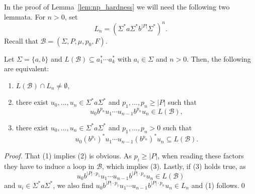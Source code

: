 \begin{toappendix}

In the proof of Lemma~\ref{lem:np_hardness}
we will need the following two lemmata.
For $n > 0$, set
\[
 L_n = (\Sigma^* a \Sigma^* b^{|P|} \Sigma^*)^n.
\]
Recall that $\mathcal B = (\Sigma, P, \mu, p_0, F)$.

\begin{lemma}
\label{lem:number_of_b_blocks}
 Let $\Sigma = \{a,b\}$ and $L(\mathcal B) \subseteq a_1^* \cdots a_k^*$
 with $a_i \in \Sigma $ and $n > 0$.
 Then, the following are equivalent:
 \begin{enumerate} 
 \item $L(\mathcal B) \cap L_n \ne \emptyset$,
 
 \item there exist $u_0, \ldots, u_n \in \Sigma^* a \Sigma^*$
  and $p_1, \ldots, p_n \ge |P|$
  such that \[
  u_0 b^{p_n} u_1 \cdots u_{n-1} b^{p_n} u_n \in L(\mathcal B),
  \]
 \item there exist $u_0, \ldots, u_n \in \Sigma^* a \Sigma^*$
  and $p_1, \ldots, p_n > 0$
  such that 
  \[ 
  u_0 (b^{p_1})^* u_1 \cdots u_{n-1} (b^{p_n})^* u_n \subseteq L(\mathcal B).
  \]
 \end{enumerate}
\end{lemma}
\begin{proof}
 That (1) implies (2) is obvious.
 As $p_i \ge |P|$, when reading these factors they have to induce a loop in $\mathcal B$,
 which implies (3).
 Lastly, if (3) holds true, as
 \[
  u_0 b^{|P|\cdot p_1} u_1 \cdots u_{n-1} b^{|P| \cdot p_n} u_n \in L(\mathcal B)
 \]
 and $u_i \in \Sigma^* a \Sigma^*$,
 we also find $u_0 b^{|P|\cdot p_1} u_1 \cdots u_{n-1} b^{|P| \cdot p_n} u_n \in L_n$
 and (1) follows.\qed
\end{proof}


\end{toappendix}
